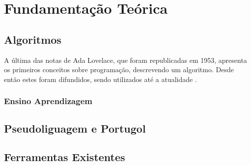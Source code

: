 
\chapter{Fundamentação Teórica}

\section{Algoritmos}

A última das notas de Ada Lovelace, que foram republicadas em 1953, apresenta os
primeiros conceitos sobre programação, descrevendo um algoritmo. Desde então estes foram difundidos, sendo utilizados até a atualidade \cite{santiagodazzi2003}.




\subsection{Ensino Aprendizagem}


\section{Pseudoliguagem e Portugol}

\section{Ferramentas Existentes}


